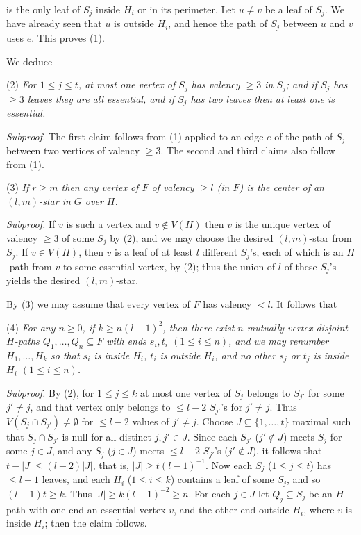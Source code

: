 \noindent is the only leaf of $S_j$ inside $H_i$ or in its perimeter. Let $u \ne v$ be a leaf of $S_j$. We have already seen that $u$ is outside $H_i$, and hence the path of $S_j$ between $u$ and $v$ uses $e$. This proves (1).

We deduce

\hspace*{12pt}(2) \textit{For $1 \le j \le t$, at most one vertex of $S_j$ has valency $\ge 3$ in $S_j$; and if $S_j$ has $\ge 3$ leaves they are all essential, and if $S_j$ has two leaves then at least one is essential.}

\textit{Subproof.} The first claim follows from (1) applied to an edge $e$ of the path of $S_j$ between two vertices of valency $\ge 3$. The second and third claims also follow from (1).

\hspace*{12pt}(3) \textit{If $r \ge m$ then any vertex of $F$ of valency $\ge l$ (in $F$) is the center of an $(l, m)$-star in $G$ over $H$.}

\textit{Subproof.} If $v$ is such a vertex and $v \notin V(H)$ then $v$ is the unique vertex of valency $\ge 3$ of some $S_j$ by (2), and we may choose the desired $(l, m)$-star from $S_j$. If $v \in V(H)$, then $v$ is a leaf of at least $l$ different $S_j$'s, each of which is an $H$-path from $v$ to some essential vertex, by (2); thus the union of $l$ of these $S_j$'s yields the desired $(l, m)$-star.

By (3) we may assume that every vertex of $F$ has valency $< l$. It follows that

\hspace*{12pt}(4) \textit{For any $n \ge 0$, if $k \ge n(l-1)^2$, then there exist $n$ mutually vertex-disjoint $H$-paths $Q_1, \dots, Q_n \subseteq F$ with ends $s_i, t_i$ $(1 \le i \le n)$, and we may renumber $H_1, \dots, H_k$ so that $s_i$ is inside $H_i$, $t_i$ is outside $H_i$, and no other $s_j$ or $t_j$ is inside $H_i$ $(1 \le i \le n)$.}

\textit{Subproof.} By (2), for $1 \le j \le k$ at most one vertex of $S_j$ belongs to $S_{j'}$ for some $j' \ne j$, and that vertex only belongs to $\le l-2$ $S_{j'}$'s for $j' \ne j$. Thus $V(S_j \cap S_{j'}) \ne \emptyset$ for $\le l-2$ values of $j' \ne j$. Choose $J \subseteq \{1, \dots, t\}$ maximal such that $S_j \cap S_{j'}$ is null for all distinct $j, j' \in J$. Since each $S_{j'}$ ($j' \notin J$) meets $S_j$ for some $j \in J$, and any $S_j$ ($j \in J$) meets $\le l-2$ $S_{j'}$'s ($j' \notin J$), it follows that $t - |J| \le (l-2)|J|$, that is, $|J| \ge t(l-1)^{-1}$. Now each $S_j$ ($1 \le j \le t$) has $\le l-1$ leaves, and each $H_i$ ($1 \le i \le k$) contains a leaf of some $S_j$, and so $(l-1)t \ge k$. Thus $|J| \ge k(l-1)^{-2} \ge n$. For each $j \in J$ let $Q_j \subseteq S_j$ be an $H$-path with one end an essential vertex $v$, and the other end outside $H_i$, where $v$ is inside $H_i$; then the claim follows.

